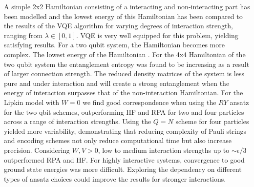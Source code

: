 A simple 2x2 Hamiltonian consisting of a interacting and non-interacting part has been modelled and the lowest energy of this Hamiltonian has been compared to the results of the VQE algorithm for varying degrees of interaction strength, ranging from $\lambda \in [0,1]$. VQE is very well equipped for this problem, yielding satisfying results. For a two qubit system, the Hamiltonian becomes more complex. The lowest energy of the Hamiltonian .
\newline For the 4x4 Hamiltonian of the two qubit system the entanglement entropy was found to be increasing as a result of larger connection strength. The reduced density matrices of the system is less pure and under interaction and will create a strong entanglement when the energy of interaction surpasses that of the non-interaction Hamiltonian. 
For the Lipkin model with $W=0$ we find good correspondence when using the $RY$ ansatz for the two qbit schemes, outperforming HF and RPA for two and four particles across a range of interaction strengths. Using the $Q = N$ scheme for four particles yielded more variability, demonstrating that reducing complexity of Pauli strings and encoding schemes not only reduce computational time but also increase precision. Considering $W, V > 0$, low to medium interaction strengths up to $\sim \epsilon/3$ outperformed RPA and HF. For highly interactive systems, convergence to good ground state energies was more difficult. Exploring the dependency on different types of ansatz choices could improve the results for stronger interactions.

